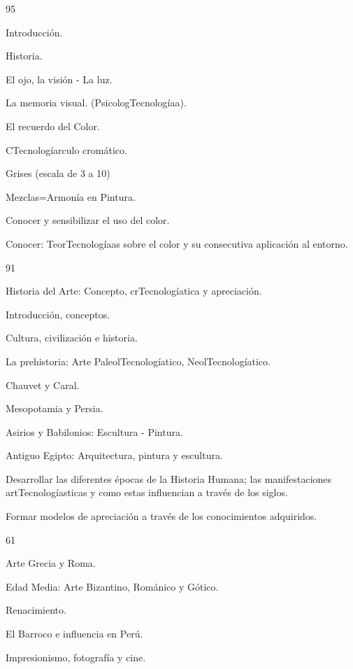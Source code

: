 \begin{syllabus}
\begin{unit}{}{}{9}{5}
\begin{topics}
	\item Introducción.
	\item Historia.
	\item El ojo, la visión - La luz.
	\item La memoria visual. (PsicologTecnologíaa).
	\item El recuerdo del Color.
	\item CTecnologíarculo cromático.
	\item Grises (escala de 3 a 10)
	\item Mezclas=Armonía en Pintura.
\end{topics}
\begin{unitgoals}
	\item Conocer y sensibilizar el uso del color.
	\item Conocer: TeorTecnologíaas sobre el color y su consecutiva aplicación al entorno.
\end{unitgoals}
\end{unit}

\begin{unit}{}{}{9}{1}
\begin{topics}
	\item Historia del Arte: Concepto, crTecnologíatica y apreciación.
	\item Introducción, conceptos.
	\item Cultura, civilización e historia.
	\item La prehistoria: Arte PaleolTecnologíatico, NeolTecnologíatico.
	\item Chauvet y Caral.
	\item Mesopotamia y Persia.
	\item Asirios y Babilonios: Escultura - Pintura.
	\item Antiguo Egipto: Arquitectura, pintura y escultura.
\end{topics}
\begin{unitgoals}
	\item Desarrollar las diferentes épocas de la Historia Humana; las manifestaciones artTecnologíasticas y como estas influencian a través de los siglos.
	\item Formar modelos de apreciación a través de los conocimientos adquiridos.
\end{unitgoals}
\end{unit}

\begin{unit}{}{}{6}{1}
\begin{topics}
	\item Arte Grecia y Roma.
	\item Edad Media: Arte Bizantino, Románico y Gótico.
	\item Renacimiento.
	\item El Barroco e influencia en Perú.
	\item Impresionismo, fotografía y cine.
\end{topics}


\end{unit}
\end{syllabus}
